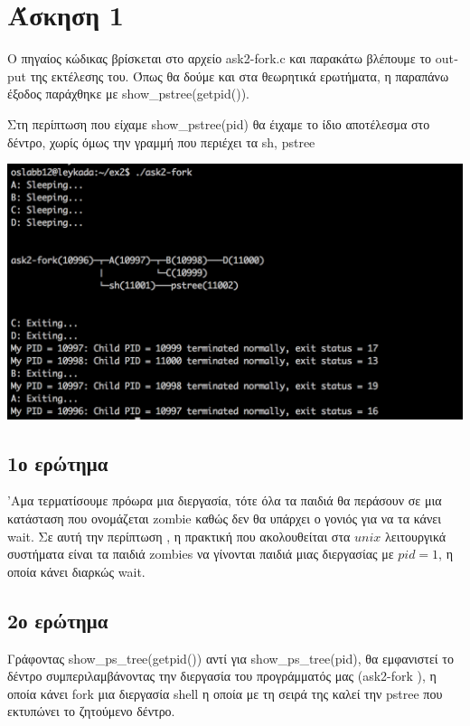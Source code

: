\documentclass[12pt]{article}
\begin{document}
\section*{Άσκηση 1}

Ο πηγαίος κώδικας βρίσκεται στο αρχείο \textlatin{ask2-fork.c} και παρακάτω βλέπουμε το  \textlatin{output} της εκτέλεσης του. Όπως θα δούμε και στα θεωρητικά ερωτήματα, η παραπάνω έξοδος παράχθηκε με \textlatin{show\_pstree(getpid())}.

 Στη περίπτωση που είχαμε  \textlatin{show\_pstree(pid)} θα έιχαμε το ίδιο αποτέλεσμα στο δέντρο, χωρίς όμως την γραμμή που περιέχει τα \textlatin{sh, pstree}

\includegraphics[scale=0.5]{ask2-fork.png}

\subsection*{1ο ερώτημα }
'Αμα τερματίσουμε πρόωρα μια διεργασία, τότε όλα τα παιδιά θα περάσουν σε μια κατάσταση που ονομάζεται \textlatin{zombie}  καθώς δεν θα υπάρχει ο γονιός για να τα κάνει \textlatin{wait}. Σε αυτή την περίπτωση , η πρακτική που ακολουθείται στα $unix$ λειτουργικά συστήματα είναι τα παιδιά \textlatin{zombies} να γίνονται παιδιά μιας διεργασίας με $pid=1$, η οποία κάνει διαρκώς \textlatin{wait}.

\subsection*{2ο ερώτημα}

Γράφοντας \textlatin{show\_ps\_tree(getpid())} αντί για \textlatin{show\_ps\_tree(pid)}, θα εμφανιστεί το δέντρο συμπεριλαμβάνοντας την διεργασία του προγράμματός μας (\textlatin{ask2-fork} ), η οποία κάνει \textlatin{fork} μια διεργασία \textlatin{shell} η οποία με τη σειρά της καλεί την \textlatin{pstree} που εκτυπώνει το ζητούμενο δέντρο.
\end{document}
